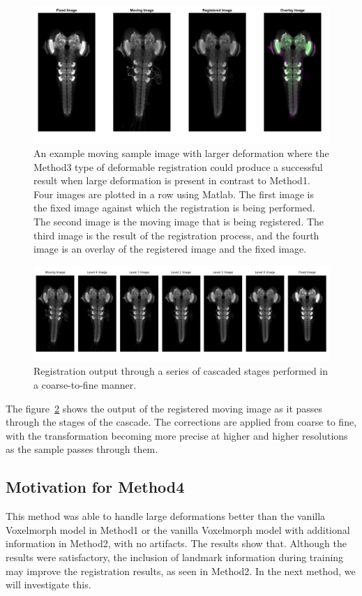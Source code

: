 \documentclass{report}
\begin{document}
	\begin{figure}[h]
		\centering
		\includegraphics[width=0.8\columnwidth]{resources/chapter4/method3/compare/np_60H12_14E09_MB049B_020113B_scaled.tif.png}
		\caption{An example moving sample image with larger deformation where the Method3 type of deformable registration could produce a successful result when large deformation is present in contrast to Method1. Four images are plotted in a row using Matlab. The first image is the fixed image against which the registration is being performed. The second image is the moving image that is being registered. The third image is the result of the registration process, and the fourth image is an overlay of the registered image and the fixed image.}
		\label{fig:method3_fail}
	\end{figure}
	
	\begin{figure}[h]
		\centering
		\includegraphics[width=\columnwidth]{resources/chapter4/method3/np_60H12_14E09_MB049B_020113B_scaled.png}
		\caption{Registration output through a series of cascaded stages performed in a coarse-to-fine manner.}
		\label{fig:method3_cascade}
	\end{figure}
	
	The figure~\ref{fig:method3_cascade} shows the output of the registered moving image as it passes through the stages of the cascade. The corrections are applied from coarse to fine, with the transformation becoming more precise at higher and higher resolutions as the sample passes through them.
	
	\subsection{Motivation for Method4}
	This method was able to handle large deformations better than the vanilla Voxelmorph model in Method1 or the vanilla Voxelmorph model with additional information in Method2, with no artifacts. The results show that. Although the results were satisfactory, the inclusion of landmark information during training may improve the registration results, as seen in Method2. In the next method, we will investigate this.
	
\end{document}
